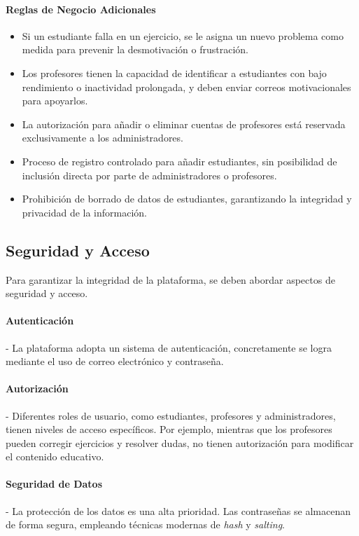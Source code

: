 \paragraph{Reglas de Negocio Adicionales}
\begin{itemize}
\item Si un estudiante falla en un ejercicio, se le asigna un nuevo problema como medida para prevenir la desmotivación o frustración.
\item Los profesores tienen la capacidad de identificar a estudiantes con bajo rendimiento o inactividad prolongada, y deben enviar correos motivacionales para apoyarlos.
\item La autorización para añadir o eliminar cuentas de profesores está reservada exclusivamente a los administradores.
\item Proceso de registro controlado para añadir estudiantes, sin posibilidad de inclusión directa por parte de administradores o profesores.
\item Prohibición de borrado de datos de estudiantes, garantizando la integridad y privacidad de la información.
\end{itemize}

\subsection{Seguridad y Acceso}

Para garantizar la integridad de la plataforma, se deben abordar aspectos de seguridad y acceso.

\paragraph{Autenticación} - La plataforma adopta un sistema de autenticación, concretamente se logra mediante el uso de correo electrónico y contraseña. 

\paragraph{Autorización} - Diferentes roles de usuario, como estudiantes, profesores y administradores, tienen niveles de acceso específicos. Por ejemplo, mientras que los profesores pueden corregir ejercicios y resolver dudas, no tienen autorización para modificar el contenido educativo.

\paragraph{Seguridad de Datos} - La protección de los datos es una alta prioridad. Las contraseñas se almacenan de forma segura, empleando técnicas modernas de \textit{hash} y \textit{salting}. 

